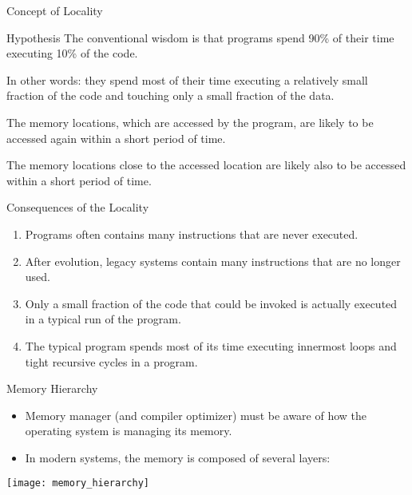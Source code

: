 \begin{bibunit}[apalike]
\begin{frame}{Concept of Locality}
	\begin{small}
	\begin{block}{\small Hypothesis}
		The conventional wisdom is that programs spend 90\% of their time executing 10\% of the code.
	\end{block}
	In other words: they spend most of their time executing a relatively small fraction of the code and touching only a small fraction of the data.
	\begin{definition}
		The memory locations, which are accessed by the program, are likely to be accessed again within a short period of time.
	\end{definition}
	\begin{definition}
		The memory locations close to the accessed location are likely also to be accessed within a short period of time.
	\end{definition}
	\end{small}
\end{frame}

\begin{frame}{Consequences of the Locality}
	\begin{enumerate}
	\item Programs often contains many instructions that are never executed.
	\vfill
	\item After evolution, legacy systems contain many instructions that are no longer used.
	\vfill
	\item Only a small fraction of the code that could be invoked is actually executed in a typical run of the program.
	\vfill
	\item The typical program spends most of its time executing innermost loops and tight recursive cycles in a program.
	\end{enumerate}
\end{frame}

\begin{frame}{Memory Hierarchy}
	\begin{itemize}
	\item Memory manager (and compiler optimizer) must be aware of how the operating system is managing its memory.
	\item In modern systems, the memory is composed of several layers:
	\end{itemize}
	\vspace{1em}
	\begin{center}
	\texttt{[image: memory\_hierarchy]}
	\end{center}
\end{frame}


\end{bibunit}
